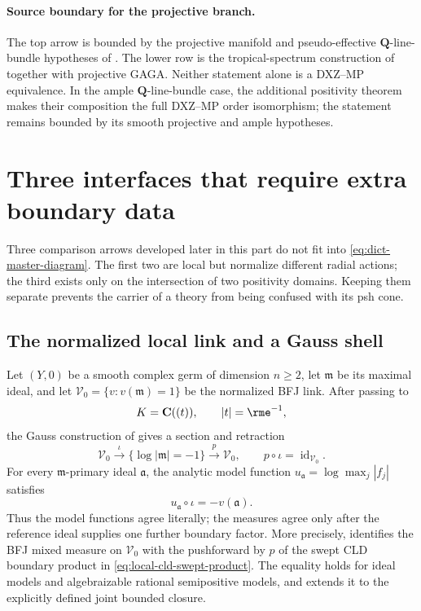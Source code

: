 \paragraph{Source boundary for the projective branch.}
The top arrow is bounded by the projective manifold and
pseudo-effective $\mathbf Q$-line-bundle hypotheses of
\cite{DXZ23}.  The lower row is the tropical-spectrum construction of
\cite{MP24} together with projective GAGA.  Neither statement alone is a
DXZ--MP equivalence.  In the ample $\mathbf Q$-line-bundle case, the
additional positivity theorem
 makes their composition the full
DXZ--MP order isomorphism; the statement remains bounded by its smooth
projective and ample hypotheses.

\section{Three interfaces that require extra boundary data}
\label{sec:dict-boundary-data-interfaces}

Three comparison arrows developed later in this part do not fit into
\eqref{eq:dict-master-diagram}.  The first two are local but normalize
different radial actions; the third exists only on the intersection of two
positivity domains.  Keeping them separate prevents the carrier of a theory
from being confused with its psh cone.

\subsection{The normalized local link and a Gauss shell}
\label{subsec:dict-gauss-shell}

Let $(Y,0)$ be a smooth complex germ of dimension $n\geq2$, let
$\mathfrak m$ be its maximal ideal, and let
$\mathcal V_0=\{v:v(\mathfrak m)=1\}$ be the normalized BFJ link.  After
passing to
\[
                 K=\mathbf C((t)),\qquad |t|=\rme^{-1},
\]
the Gauss construction of  gives a section
and retraction
\[
 \mathcal V_0\xrightarrow{\ \iota\ }
 \{\log|\mathfrak m|=-1\}
 \xrightarrow{\ p\ }\mathcal V_0,
 \qquad p\circ\iota=\operatorname{id}_{\mathcal V_0}.
\]
For every $\mathfrak m$-primary ideal $\mathfrak a$, the analytic model
function $u_{\mathfrak a}=\log\max_j|f_j|$ satisfies
\[
             u_{\mathfrak a}\circ\iota=-v(\mathfrak a).
\]
Thus the model functions agree literally; the measures agree only after the
reference ideal supplies one further boundary factor.  More precisely,
 identifies the BFJ mixed measure on
$\mathcal V_0$ with the pushforward by $p$ of the swept CLD boundary
product in \eqref{eq:local-cld-swept-product}.  The equality holds for ideal
models and algebraizable rational semipositive models, and
 extends it to the explicitly defined
joint bounded closure.

